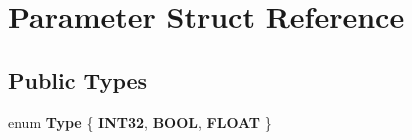 \hypertarget{structParameter}{}\section{Parameter Struct Reference}
\label{structParameter}
\subsection*{Public Types}
\begin{DoxyCompactItemize}
\item 
\mbox{\label{structParameter_a2e54b19a2f4144b731536400c10c1594}} 
enum {\bfseries Type} \{ {\bfseries I\+N\+T32}, 
{\bfseries B\+O\+OL}, 
{\bfseries F\+L\+O\+AT}
 \}
\end{DoxyCompactItemize}
